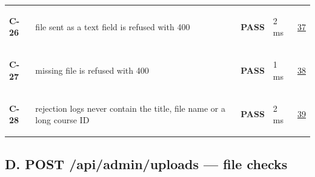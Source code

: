 \documentclass[10pt,a4paper]{article}
\begin{document}
\begin{longtable}{@{}P{1.2cm}P{9.2cm}P{1.2cm}P{1.3cm}P{2.4cm}@{}}
\hypertarget{test-C-26}{\textbf{C-26}} & file sent as a text field is refused with 400 & \textcolor{passgreen}{\textbf{PASS}} & 2 ms & \hyperlink{call37}{37} \\
\hypertarget{test-C-27}{\textbf{C-27}} & missing file is refused with 400 & \textcolor{passgreen}{\textbf{PASS}} & 1 ms & \hyperlink{call38}{38} \\
\hypertarget{test-C-28}{\textbf{C-28}} & rejection logs never contain the title, file name or a long course ID & \textcolor{passgreen}{\textbf{PASS}} & 2 ms & \hyperlink{call39}{39} \\
\bottomrule
\end{longtable}

\subsection*{D. POST /api/admin/uploads — file checks}
\end{document}

